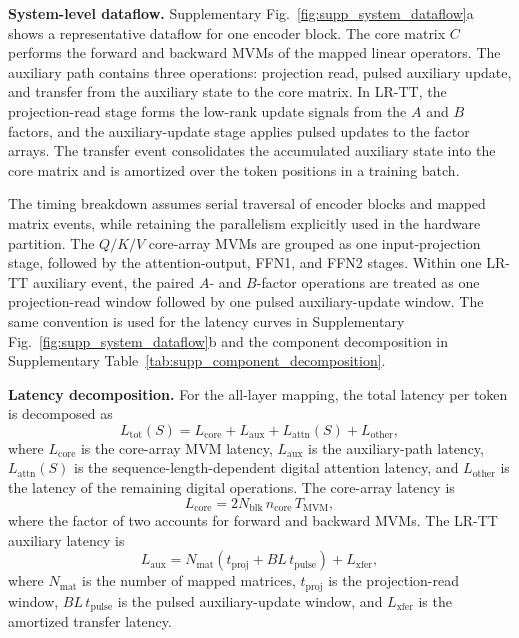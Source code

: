 \documentclass[fleqn,10pt]{wlscirep}
\begin{document}
\noindent\textbf{System-level dataflow.}
Supplementary Fig.~\ref{fig:supp_system_dataflow}a shows a representative dataflow for one encoder block. The core matrix \(C\) performs the forward and backward MVMs of the mapped linear operators. The auxiliary path contains three operations: projection read, pulsed auxiliary update, and transfer from the auxiliary state to the core matrix. In LR-TT, the projection-read stage forms the low-rank update signals from the \(A\) and \(B\) factors, and the auxiliary-update stage applies pulsed updates to the factor arrays. The transfer event consolidates the accumulated auxiliary state into the core matrix and is amortized over the token positions in a training batch.

\noindent
The timing breakdown assumes serial traversal of encoder blocks and mapped matrix events, while retaining the parallelism explicitly used in the hardware partition. The \(Q/K/V\) core-array MVMs are grouped as one input-projection stage, followed by the attention-output, FFN1, and FFN2 stages. Within one LR-TT auxiliary event, the paired \(A\)- and \(B\)-factor operations are treated as one projection-read window followed by one pulsed auxiliary-update window. The same convention is used for the latency curves in Supplementary Fig.~\ref{fig:supp_system_dataflow}b and the component decomposition in Supplementary Table~\ref{tab:supp_component_decomposition}.

\noindent\textbf{Latency decomposition.}
For the all-layer mapping, the total latency per token is decomposed as
\begin{equation}
L_{\mathrm{tot}}(S)
=
L_{\mathrm{core}}
+
L_{\mathrm{aux}}
+
L_{\mathrm{attn}}(S)
+
L_{\mathrm{other}},
\label{eq:supp_total_latency}
\end{equation}
where \(L_{\mathrm{core}}\) is the core-array MVM latency, \(L_{\mathrm{aux}}\) is the auxiliary-path latency, \(L_{\mathrm{attn}}(S)\) is the sequence-length-dependent digital attention latency, and \(L_{\mathrm{other}}\) is the latency of the remaining digital operations. The core-array latency is
\begin{equation}
L_{\mathrm{core}}
=
2N_{\mathrm{blk}}\,n_{\mathrm{core}}\,T_{\mathrm{MVM}},
\label{eq:supp_core_latency}
\end{equation}
where the factor of two accounts for forward and backward MVMs. The LR-TT auxiliary latency is
\begin{equation}
L_{\mathrm{aux}}
=
N_{\mathrm{mat}}
\left(t_{\mathrm{proj}}+BL\,t_{\mathrm{pulse}}\right)
+
L_{\mathrm{xfer}},
\label{eq:supp_aux_latency}
\end{equation}
where \(N_{\mathrm{mat}}\) is the number of mapped matrices, \(t_{\mathrm{proj}}\) is the projection-read window, \(BL\,t_{\mathrm{pulse}}\) is the pulsed auxiliary-update window, and \(L_{\mathrm{xfer}}\) is the amortized transfer latency.
\end{document}
